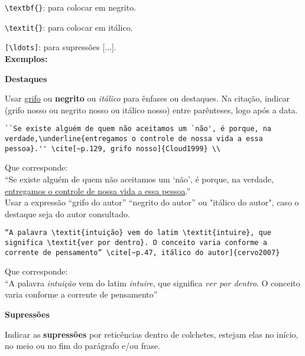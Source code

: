 \verb+\textbf{}+: para colocar em negrito.

\verb+\textit{}+: para colocar em itálico.

\verb+[\ldots]+: para supressões [...]. \\

\textbf{Exemplos:}

\begin{alineas}
\item

\textbf{Destaques}

Usar \underline{grifo} ou \textbf{negrito} ou \textit{itálico} para ênfases ou destaques. Na citação, indicar (grifo nosso ou negrito nosso ou itálico nosso) entre parênteses, logo após a data.

\begin{verbatim}
``Se existe alguém de quem não aceitamos um `não', é porque, na 
verdade,\underline{entregamos o controle de nossa vida a essa 
pessoa}.'' \cite[~p.129, grifo nosso]{Cloud1999} \\
\end{verbatim}	

Que corresponde: \\

``Se existe alguém de quem não aceitamos um `não', é porque, na verdade,
\underline{entregamos o controle de nossa vida a essa pessoa}.'' \cite[~p.129, grifo nosso]{Cloud1999} \\

Usar a expressão “grifo do autor” “negrito do autor” ou "itálico do autor", caso o destaque seja do autor consultado.

\begin{verbatim}
“A palavra \textit{intuição} vem do latim \textit{intuire}, que 
significa \textit{ver por dentro}. O conceito varia conforme a
corrente de pensamento” \cite[~p.47, itálico do autor]{cervo2007}
\end{verbatim}

Que corresponde: \\

“A palavra \textit{intuição} vem do latim \textit{intuire}, que 
significa \textit{ver por dentro}. O conceito varia conforme a
corrente de pensamento” \cite[~p.47, itálico do autor]{cervo2007}\\

\item

\textbf{Supressões}

Indicar as \textbf{supressões} por reticências dentro de colchetes, estejam elas no início, no meio ou no fim do parágrafo e/ou frase.


\end{alineas}
